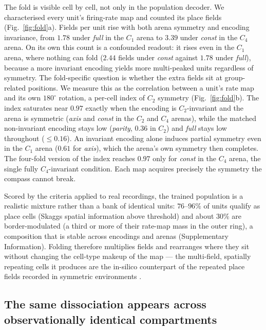 \documentclass[9pt,lineno]{elife}
\begin{document}
The fold is visible cell by cell, not only in the population decoder. We characterised every
unit's firing-rate map and counted its place fields (Fig.~\ref{fig:fold}a). Fields per unit
rise with both arena symmetry and encoding invariance, from $1.78$ under \textit{full} in the
$C_1$ arena to $3.39$ under \textit{const} in the $C_4$ arena. On its own this count is a
confounded readout: it rises even in the $C_1$ arena, where nothing can fold ($2.44$ fields
under \textit{const} against $1.78$ under \textit{full}), because a more invariant encoding
yields more multi-peaked units regardless of symmetry. The fold-specific question is whether
the extra fields sit at group-related positions. We measure this as the correlation between a
unit's rate map and its own $180^\circ$ rotation, a per-cell index of $C_2$ symmetry
(Fig.~\ref{fig:fold}b). The index saturates near $0.97$ exactly when the encoding is
$C_2$-invariant and the arena is symmetric (\textit{axis} and \textit{const} in the $C_2$ and
$C_4$ arenas), while the matched non-invariant encoding stays low (\textit{parity}, $0.36$ in
$C_2$) and \textit{full} stays low throughout ($\le 0.16$). An invariant encoding alone induces
partial symmetry even in the $C_1$ arena ($0.61$ for \textit{axis}), which the arena's own
symmetry then completes. The four-fold version of the index reaches $0.97$ only for
\textit{const} in the $C_4$ arena, the single fully $C_4$-invariant condition. Each map
acquires precisely the symmetry the compass cannot break.

Scored by the criteria applied to real recordings, the trained population is a realistic
mixture rather than a bank of identical units: $76$--$96\%$ of units qualify as place cells
(Skaggs spatial information above threshold) and about $30\%$ are border-modulated (a third or
more of their rate-map mass in the outer ring), a composition that is stable across encodings and
arenas (Supplementary Information). Folding therefore multiplies fields and rearranges where they sit without changing the
cell-type makeup of the map --- the multi-field, spatially repeating cells it produces are the
in-silico counterpart of the repeated place fields recorded in symmetric environments
\citep{muller1987, grieves2016}.

\subsection{The same dissociation appears across observationally identical compartments}
\end{document}
